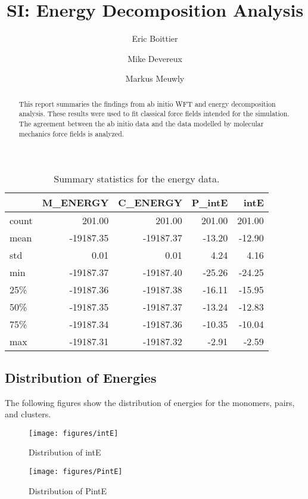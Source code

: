 \documentclass[journal=jacsat,manuscript=article]{achemso}
\author{Eric Boittier}
\author{Mike Devereux}
\author{Markus Meuwly}
\affiliation[University of Basel]
{Department of Chemistry, University of Basel, Switzerland}
\title[ Energy Decomposition Analysis ] { SI: Energy Decomposition Analysis }
\begin{document}
\begin{abstract}
 This report summaries the findings from 
ab initio WFT and energy decomposition analysis. These results were used to fit
classical force fields intended for the simulation. The agreement between 
the ab initio data and the data modelled by molecular mechanics force fields is analyzed.

\end{abstract}

\clearpage
\begin{table}[b!]
\centering
\caption{Summary statistics for the energy data.}
\label{tab:energy_stats}
\begin{tabular}{lrrrr}
\toprule
{} &  M\_ENERGY &  C\_ENERGY &  P\_intE &   intE \\
\midrule
count &    201.00 &    201.00 &  201.00 & 201.00 \\
mean  & -19187.35 & -19187.37 &  -13.20 & -12.90 \\
std   &      0.01 &      0.01 &    4.24 &   4.16 \\
min   & -19187.37 & -19187.40 &  -25.26 & -24.25 \\
25\%   & -19187.36 & -19187.38 &  -16.11 & -15.95 \\
50\%   & -19187.35 & -19187.37 &  -13.24 & -12.83 \\
75\%   & -19187.34 & -19187.36 &  -10.35 & -10.04 \\
max   & -19187.31 & -19187.32 &   -2.91 &  -2.59 \\
\bottomrule
\end{tabular}
\end{table}

\subsection{Distribution of Energies} 
 The following figures show the distribution of energies for the monomers, pairs, and clusters.

\begin{figure}
    \centering
    \texttt{[image: figures/intE]}
    \caption{ Distribution of intE }
    \label{fig:_intE}
\end{figure}

\begin{figure}
    \centering
    \texttt{[image: figures/PintE]}
    \caption{ Distribution of PintE }
    \label{fig:_PintE}
\end{figure}
\end{document}
